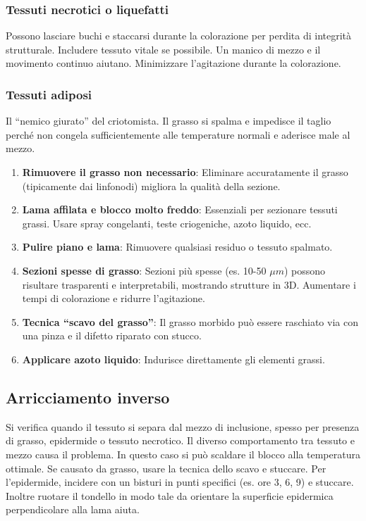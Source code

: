 \subsubsection{Tessuti necrotici o liquefatti} 
Possono lasciare buchi e staccarsi durante la colorazione per perdita di integrità strutturale. Includere tessuto vitale se possibile. Un manico di mezzo e il movimento continuo aiutano. Minimizzare l'agitazione durante la colorazione.
\subsubsection{Tessuti adiposi} 
Il ``nemico giurato'' del criotomista. Il grasso si spalma e impedisce il taglio perché non congela sufficientemente alle temperature normali e aderisce male al mezzo.
\begin{enumerate}
\item \textbf{Rimuovere il grasso non necessario}: Eliminare accuratamente il grasso (tipicamente dai linfonodi) migliora la qualità della sezione.
\item \textbf{Lama affilata e blocco molto freddo}: Essenziali per sezionare tessuti grassi. Usare spray congelanti, teste criogeniche, azoto liquido, ecc.
\item \textbf{Pulire piano e lama}: Rimuovere qualsiasi residuo o tessuto spalmato.
\item \textbf{Sezioni spesse di grasso}: Sezioni più spesse (es. 10-50 $\mu m$) possono risultare trasparenti e interpretabili, mostrando strutture in 3D. Aumentare i tempi di colorazione e ridurre l'agitazione.
\item \textbf{Tecnica “scavo del grasso”}: Il grasso morbido può essere raschiato via con una pinza e il difetto riparato con stucco.
\item \textbf{Applicare azoto liquido}: Indurisce direttamente gli elementi grassi.
\end{enumerate}


\subsection{Arricciamento inverso}
Si verifica quando il tessuto si separa dal mezzo di inclusione, spesso per presenza di grasso, epidermide o tessuto necrotico. Il diverso comportamento tra tessuto e mezzo causa il problema. In questo caso si può scaldare il blocco alla temperatura ottimale. Se causato da grasso, usare la tecnica dello scavo e stuccare. Per l'epidermide, incidere con un bisturi in punti specifici (es. ore 3, 6, 9) e stuccare. Inoltre ruotare il tondello in modo tale da orientare la superficie epidermica perpendicolare alla lama aiuta.

